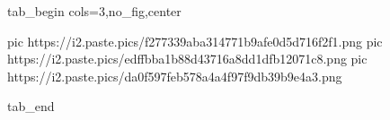  
 
 
 
 


\ifcmt
  tab_begin cols=3,no_fig,center

     pic https://i2.paste.pics/f277339aba314771b9afe0d5d716f2f1.png
		 pic https://i2.paste.pics/edffbba1b88d43716a8dd1dfb12071c8.png
		 pic https://i2.paste.pics/da0f597feb578a4a4f97f9db39b9e4a3.png

  tab_end
\fi
